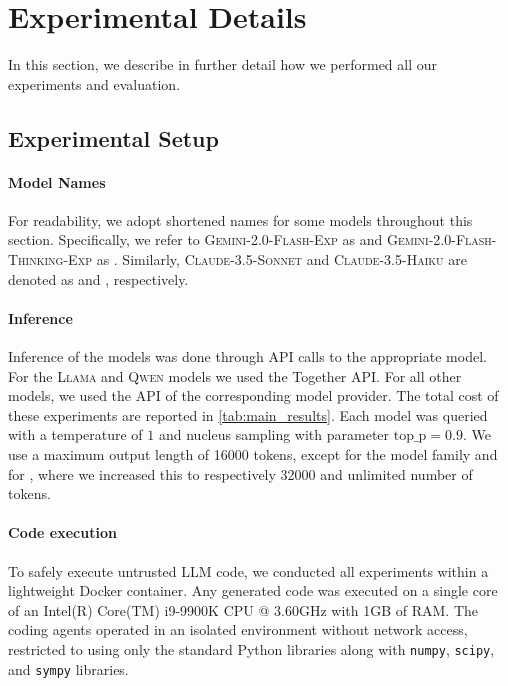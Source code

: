 \section{Experimental Details} \label{app:exp_details}
In this section, we describe in further detail how we performed all our experiments and evaluation.

\subsection{Experimental Setup}
\label{app:exp:exp_setup}

\paragraph{Model Names} For readability, we adopt shortened names for some models throughout this section. Specifically, we refer to \textsc{Gemini-2.0-Flash-Exp} as \flash{} and \textsc{Gemini-2.0-Flash-Thinking-Exp} as \geminithink{}. Similarly, \textsc{Claude-3.5-Sonnet} and \textsc{Claude-3.5-Haiku} are denoted as \claudesonnet{} and \claudehaiku{}, respectively.

\paragraph{Inference} Inference of the models was done through API calls to the appropriate model. For the \textsc{Llama} and \textsc{Qwen} models we used the Together API. For all other models, we used the API of the corresponding model provider. The total cost of these experiments are reported in \cref{tab:main_results}. Each model was queried with a temperature of $1$ and nucleus sampling with parameter $\text{top\_p}=0.9$. We use a maximum output length of 16000 tokens, except for the \oone{} model family and for \geminithink{}, where we increased this to respectively 32000 and unlimited number of tokens.

\paragraph{Code execution} To safely execute untrusted LLM code, we conducted all experiments within a lightweight Docker container. Any generated code was executed on a single core of an Intel(R) Core(TM) i9-9900K CPU @ 3.60GHz with 1GB of RAM. The coding agents operated in an isolated environment without network access, restricted to using only the standard Python libraries along with \texttt{numpy}, \texttt{scipy}, and \texttt{sympy} libraries.

